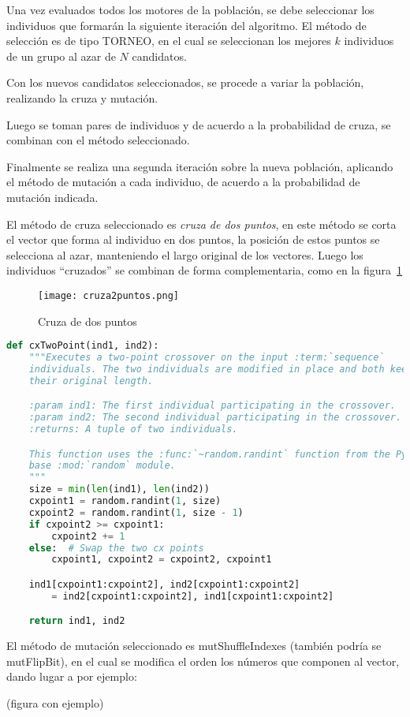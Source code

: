 Una vez evaluados todos los motores de la población, se debe seleccionar los
individuos que formarán la siguiente iteración del algoritmo.
%
El método de selección es de tipo TORNEO, en el cual se seleccionan los mejores
$k$ individuos de un grupo al azar de $N$ candidatos.
%

Con los nuevos candidatos seleccionados, se procede a variar la población,
realizando la cruza y mutación.

Luego se toman pares de individuos y de acuerdo a la probabilidad de cruza, se
combinan con el método seleccionado.

Finalmente se realiza una segunda iteración sobre la nueva población, aplicando
el método de mutación a cada individuo, de acuerdo a la probabilidad de
mutación indicada.


El método de cruza seleccionado es \emph{cruza de dos puntos}, en este método
se corta el vector que forma al individuo en dos puntos, la posición de estos
puntos se selecciona al azar, manteniendo el largo original de los vectores.
%
Luego los individuos ``cruzados'' se combinan de forma complementaria, como en
la figura~\ref{fig:cr2puntos}

\begin{figure}
  \centering
  \texttt{[image: cruza2puntos.png]}
  \caption{Cruza de dos puntos}\label{fig:cr2puntos}
\end{figure}


\begin{lstlisting}[language=Python]
def cxTwoPoint(ind1, ind2):
    """Executes a two-point crossover on the input :term:`sequence`
    individuals. The two individuals are modified in place and both keep
    their original length.

    :param ind1: The first individual participating in the crossover.
    :param ind2: The second individual participating in the crossover.
    :returns: A tuple of two individuals.

    This function uses the :func:`~random.randint` function from the Python
    base :mod:`random` module.
    """
    size = min(len(ind1), len(ind2))
    cxpoint1 = random.randint(1, size)
    cxpoint2 = random.randint(1, size - 1)
    if cxpoint2 >= cxpoint1:
        cxpoint2 += 1
    else:  # Swap the two cx points
        cxpoint1, cxpoint2 = cxpoint2, cxpoint1

    ind1[cxpoint1:cxpoint2], ind2[cxpoint1:cxpoint2]
        = ind2[cxpoint1:cxpoint2], ind1[cxpoint1:cxpoint2]

    return ind1, ind2
\end{lstlisting}


El método de mutación seleccionado es mutShuffleIndexes (también podría se
mutFlipBit), en el cual se modifica el orden los números que componen al
vector, dando lugar a por ejemplo:

(figura con ejemplo)
